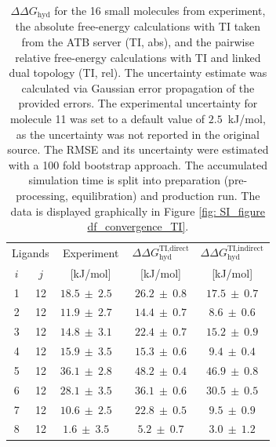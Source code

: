 \begin{table}[h!]
\caption{$\Delta \Delta G_\text{hyd}$ for the 16 small molecules from experiment, the absolute free-energy calculations with TI taken from the ATB server\cite{Stroet2018} (TI, abs), and the pairwise relative free-energy calculations with TI and linked dual topology (TI, rel).
The uncertainty estimate was calculated via Gaussian error propagation of the provided errors. The experimental uncertainty for molecule 11 was set to a default value of $2.5$~kJ/mol\cite{Mobley2014}, as the uncertainty was not reported in the original source\cite{Wolfenden1987}. The RMSE and its uncertainty were estimated with a 100 fold bootstrap approach. The accumulated simulation time is split into preparation (pre-processing, equilibration) and production run. The data is displayed graphically in Figure \ref{fig: SI_figure df_convergence_TI}.}
\begin{center}
\begin{adjustbox}{max width=\textwidth}
\begin{tabular}{ | c c |c |c|c|}
\hline
  \multicolumn{2}{|c|}{Ligands} & \multicolumn{1}{c|}{Experiment} &\multicolumn{1}{c|}{$\Delta\Delta G_\text{hyd}^\text{TI,direct}$}&\multicolumn{1}{c|}{$\Delta\Delta G_\text{hyd}^\text{TI,indirect}$}\\ 
    $i$ & $j$ & [kJ/mol] & [kJ/mol] & [kJ/mol]  \\
  \hline \hline
        1 &  12 &  $18.5 ~\pm~ 2.5$ ~\cite{Guthrie2014,Rizzo2006}&  $26.2 ~\pm~ 0.8$ &  $  17.5 ~\pm~ 0.7$\\
        2 &  12 &  $11.9 ~\pm~ 2.7$  ~\cite{Guthrie2014,Rizzo2006}  &  $14.4 ~\pm~ 0.7$ &  $  8.6 ~\pm~ 0.6 $\\
        3 &  12 &  $14.8 ~\pm~ 3.1$  ~\cite{Guthrie2014,Rizzo2006}  &  $22.4 ~\pm~ 0.7$ &  $ 15.2 ~\pm~ 0.9 $\\
        4 &  12 &  $15.9 ~\pm~ 3.5$  ~\cite{Rizzo2006} &  $15.3 ~\pm~ 0.6$ &  $  9.4 ~\pm~ 0.4 $\\
        5 &  12 &   $36.1 ~\pm~ 2.8$  ~\cite{Guthrie2014,Rizzo2006}  &  $48.2 ~\pm~ 0.4$ &  $ 46.9 ~\pm~ 0.8 $\\
        6 &  12 &   $28.1 ~\pm~ 3.5$  ~\cite{Rizzo2006}  &  $36.1 ~\pm~ 0.6$ & $  30.5 ~\pm~ 0.5 $\\
        7 &  12 &   $10.6 ~\pm~ 2.5$  ~\cite{Guthrie2009,Rizzo2006} &  $22.8 ~\pm~ 0.5$ &  $  9.5 ~\pm~ 0.9 $\\
        8 &  12 &   $ 1.6 ~\pm~ 3.5$  ~\cite{Mobley2014,Rizzo2006} &  $ 5.2 ~\pm~ 0.7$ &  $ 3.0 ~\pm~ 1.2 $\\

\end{tabular}
\end{adjustbox}
\end{center}
\end{table}
